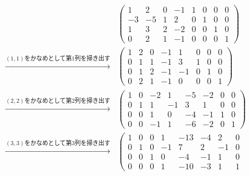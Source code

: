 \documentclass[a4paper,10pt,fleqn]{ltjsarticle}
\begin{document}
\begin{leftbar}
    \begin{align*}
                                                      &
        \left(
        \begin{array}{cccc|cccc}
                1  & 2  & 0 & -1 & 1 & 0 & 0 & 0 \\
                -3 & -5 & 1 & 2  & 0 & 1 & 0 & 0 \\
                1  & 3  & 2 & -2 & 0 & 0 & 1 & 0 \\
                0  & 2  & 1 & -1 & 0 & 0 & 0 & 1
            \end{array}
        \right)                                         \\
        \xrightarrow{\text{$(1,1)$をかなめとして第$1$列を掃き出す}} &
        \left( \begin{array}{cccc|cccc}
                       1 & 2 & 0 & -1 & 1  & 0 & 0 & 0 \\
                       0 & 1 & 1 & -1 & 3  & 1 & 0 & 0 \\
                       0 & 1 & 2 & -1 & -1 & 0 & 1 & 0 \\
                       0 & 2 & 1 & -1 & 0  & 0 & 0 & 1
                   \end{array}
        \right)                                         \\
        \xrightarrow{\text{$(2,2)$をかなめとして第$2$列を掃き出す}} &
        \left( \begin{array}{cccc|cccc}
                       1 & 0 & -2 & 1  & -5 & -2 & 0 & 0 \\
                       0 & 1 & 1  & -1 & 3  & 1  & 0 & 0 \\
                       0 & 0 & 1  & 0  & -4 & -1 & 1 & 0 \\
                       0 & 0 & -1 & 1  & -6 & -2 & 0 & 1
                   \end{array}
        \right)                                         \\
        \xrightarrow{\text{$(3,3)$をかなめとして第$3$列を掃き出す}} &
        \left( \begin{array}{cccc|cccc}
                       1 & 0 & 0 & 1  & -13 & -4 & 2  & 0 \\
                       0 & 1 & 0 & -1 & 7   & 2  & -1 & 0 \\
                       0 & 0 & 1 & 0  & -4  & -1 & 1  & 0 \\
                       0 & 0 & 0 & 1  & -10 & -3 & 1  & 1

\end{array}
\end{align*}
\end{leftbar}
\end{document}
